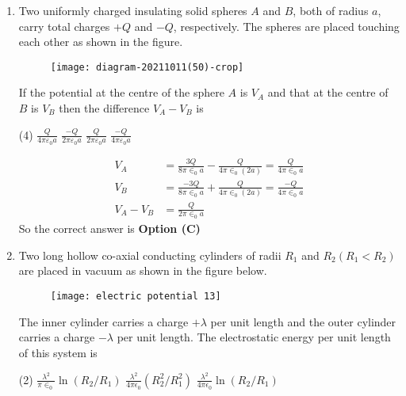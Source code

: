 \begin{enumerate}
\begin{answer}
	\end{answer}
	\item Two uniformly charged insulating solid spheres $A$ and $B$, both of radius $a$, carry total charges $+Q$ and $-Q$, respectively. The spheres are placed touching each other as shown in the figure.\\
	\begin{figure}[H]
		\centering
		\texttt{[image: diagram-20211011(50)-crop]}
	\end{figure}
	If the potential at the centre of the sphere $A$ is $V_{A}$ and that at the centre of $B$ is $V_{B}$ then the difference $V_{A}-V_{B}$ is
	{}
	\begin{tasks}(4)
		\task[\textbf{A.}] $\frac{Q}{4 \pi \varepsilon_{0} a}$
		\task[\textbf{B.}] $\frac{-Q}{2 \pi \varepsilon_{0} a}$
		\task[\textbf{C.}] $\frac{Q}{2 \pi \varepsilon_{0} a}$
		\task[\textbf{D.}] $\frac{-Q}{4 \pi \varepsilon_{0} a}$
	\end{tasks}
	\begin{answer}
		\begin{align*}
		V_{A}&=\frac{3 Q}{8 \pi \in_{0} a}-\frac{Q}{4 \pi \in_{0}(2 a)}=\frac{Q}{4 \pi \in_{0} a}\\
		V_{B}&=\frac{-3 Q}{8 \pi \in_{0} a}+\frac{Q}{4 \pi \in_{0}(2 a)}=\frac{-Q}{4 \pi \in_{0} a}\\
		V_{A}-V_{B}&=\frac{Q}{2 \pi \in_{0} a}
		\end{align*}
		So the correct answer is \textbf{Option (C)}
	\end{answer}
	\item Two long hollow co-axial conducting cylinders of radii $R_{1}$ and $R_{2}\left(R_{1}<R_{2}\right)$ are placed in vacuum as shown in the figure below.\\
	\begin{figure}[H]
		\centering
		\texttt{[image: electric potential 13]}
	\end{figure}
	The inner cylinder carries a charge $+\lambda$ per unit length and the outer cylinder carries a charge $-\lambda$ per unit length. The electrostatic energy per unit length of this system is
	{}
	\begin{tasks}(2)
		\task[\textbf{A.}] $\frac{\lambda^{2}}{\pi \in_{0}} \ln \left(R_{2} / R_{1}\right)$
		\task[\textbf{B.}] $\frac{\lambda^{2}}{4 \pi \epsilon_{0}}\left(R_{2}^{2} / R_{1}^{2}\right)$
		\task[\textbf{C.}] $\frac{\lambda^{2}}{4 \pi \epsilon_{0}} \ln \left(R_{2} / R_{1}\right)$

\end{tasks}
\end{enumerate}
